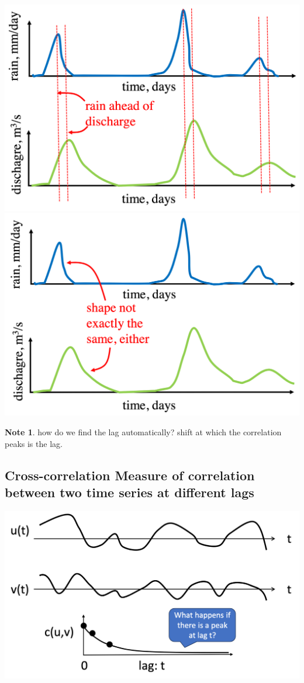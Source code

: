\documentclass[11pt]{article}
\theoremstyle{definition}
\newtheorem{note}{Note}
\begin{document}
\includegraphics[width=\textwidth/4]{11.png}
\includegraphics[width=\textwidth/4]{12.png}

\begin{note}
  how do we find the lag automatically? 
  shift at which the correlation peaks is the lag.
\end{note}

\subsection{Cross-correlation
Measure of correlation between two time series
at different lags}
\includegraphics[width=\textwidth/2]{13.png}
\end{document}
